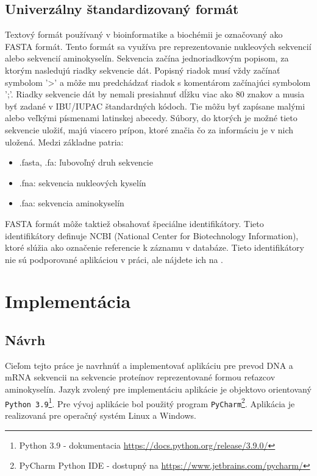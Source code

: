 \section{Univerzálny štandardizovaný formát}
Textový formát používaný v bioinformatike a biochémii je označovaný ako FASTA formát. Tento formát sa využíva pre reprezentovanie nukleových sekvencií alebo sekvencií aminokyselín. Sekvencia začína jednoriadkovým popisom, za ktorým nasledujú riadky sekvencie dát. Popisný riadok musí vždy začínať symbolom '>' a môže mu predchádzať riadok s komentárom začínajúci symbolom ';'. Riadky sekvencie dát by nemali presiahnuť dĺžku viac ako 80 znakov a musia byť zadané v IBU/IUPAC štandardných kódoch. Tie môžu byť zapísane malými alebo veľkými písmenami latinskej abecedy. Súbory, do ktorých je možné tieto sekvencie uložiť, majú viacero prípon, ktoré značia čo za informáciu je v nich uložená. Medzi základne patria:
\begin{itemize}
\item .fasta, .fa: ľubovoľný druh sekvencie
\item .fna: sekvencia nukleových kyselín
\item .faa: sekvencia aminokyselín
\end{itemize}
FASTA formát môže taktiež obsahovať špeciálne identifikátory. Tieto identifikátory definuje NCBI (National Center for Biotechnology Information), ktoré slúžia ako označenie referencie k záznamu v databáze. Tieto identifikátory nie sú podporované aplikáciou v práci, ale nájdete ich na \cite{FastaID}.


\chapter{Implementácia}

\section{Návrh}
\label{navrh}
Cieľom tejto práce je navrhnúť a implementovať aplikáciu pre prevod DNA a mRNA sekvencii na sekvencie proteínov reprezentované formou reťazcov aminokyselín. Jazyk zvolený pre implementáciu aplikácie je objektovo orientovaný \texttt{Python 3.9}\footnote{Python 3.9 - dokumentacia \href{https://docs.python.org/release/3.9.0/}{https://docs.python.org/release/3.9.0/}}. Pre vývoj aplikácie bol použitý program \texttt{PyCharm}\footnote{PyCharm Python IDE - dostupný na \href{https://www.jetbrains.com/pycharm/}{https://www.jetbrains.com/pycharm/} }. Aplikácia je realizovaná pre operačný systém Linux a Windows.

